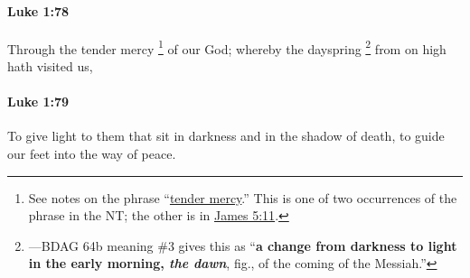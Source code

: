 		\paragraph{Luke 1:78} %
			\label{LUKE-1-78}

			Through the tender mercy%
				\footnote{%
					See notes on the phrase ``\hyperref[MERCY-PHRASES]{tender mercy}.'' This is one of two occurrences of the phrase in the NT; the other is in \hyperref[JAMES-5-11]{James 5:11}.
					}
			of our God; whereby the dayspring%
				\footnote{%
					---BDAG 64b meaning \#3 gives this as ``\textbf{a change from darkness to light in the early morning, \textit{the dawn}}, fig., of the coming of the Messiah.'' 
					}
			from on high hath visited us,

			\begin{framed}
			\scriptsize
				\begin{compactdesc}
					\item[SBLG] 
				\end{compactdesc}
			\end{framed}

		\paragraph{Luke 1:79} %
			\label{LUKE-1-79}

			To give light to them that sit in darkness and in the shadow of death, to guide our feet into the way of peace.

